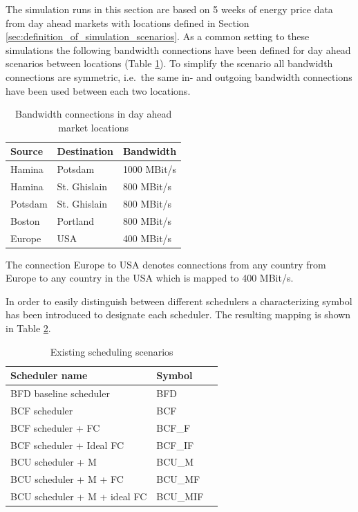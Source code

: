 The simulation runs in this section are based on 5 weeks of energy price data from day ahead markets with locations defined in Section \ref{sec:definition_of_simulation_scenarios}. As a common setting to these simulations the following bandwidth connections have been defined for day ahead scenarios between locations (Table \ref{tab:bandwidth_connections_in_da_markets}). To simplify the scenario all bandwidth connections are symmetric, i.e.~the same in- and outgoing bandwidth connections have been used between each two locations. 


\begin{table}[htbp]
\centering
\begin{tabular}{lll}
\toprule
	Source & Destination & Bandwidth \\
\midrule
	Hamina & Potsdam & 1000 MBit/s \\
	Hamina & St. Ghislain & 800 MBit/s \\
	Potsdam & St. Ghislain & 800 MBit/s \\
	Boston & Portland & 800 MBit/s \\
	Europe & USA & 400 MBit/s \\
\bottomrule
\end{tabular}
\caption{Bandwidth connections in day ahead market locations}
\label{tab:bandwidth_connections_in_da_markets}
\end{table}

The connection Europe to USA denotes connections from any country from Europe to any country in the USA which is mapped to 400 MBit/s. 

In order to easily distinguish between different schedulers a characterizing symbol has been introduced to designate each scheduler. The resulting mapping is shown in Table \ref{tab:scheduler_name_mapping}.

\begin{table}[htbp]
\centering
\begin{tabular}{lll}
\toprule
  Scheduler name & Symbol \\
\midrule
	BFD baseline scheduler & BFD \\
	BCF scheduler & BCF \\
	BCF scheduler + FC & BCF\_F \\
	BCF scheduler + Ideal FC & BCF\_IF \\
	BCU scheduler + M & BCU\_M \\
	BCU scheduler + M + FC & BCU\_MF \\
	BCU scheduler + M + ideal FC & BCU\_MIF \\
\bottomrule
\end{tabular}
\caption{Existing scheduling scenarios}
\label{tab:scheduler_name_mapping}
\end{table}


